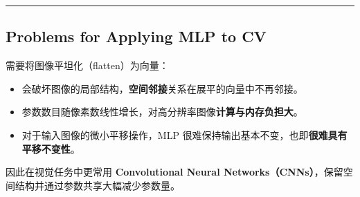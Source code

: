 \begin{center}\rule{0.5\linewidth}{0.5pt}\end{center}

\subsection{Problems for Applying MLP to
  CV}\label{problems-for-applying-mlp-to-cv}

需要将图像平坦化（flatten）为向量：

\begin{itemize}
  \tightlist
  \item
        会破坏图像的局部结构，\textbf{空间邻接}关系在展平的向量中不再邻接。
  \item
        参数数目随像素数线性增长，对高分辨率图像\textbf{计算与内存负担大}。
  \item
        对于输入图像的微小平移操作，MLP
        很难保持输出基本不变，也即\textbf{很难具有平移不变性}。
\end{itemize}

因此在视觉任务中更常用 \textbf{Convolutional Neural
  Networks（CNNs）}，保留空间结构并通过参数共享大幅减少参数量。
